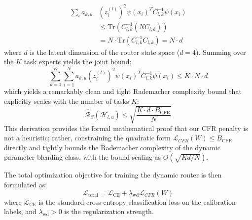 \begin{align}
    \sum_i a_{k, u}&(z_i^{(l)})^2 \psi(x_i)^T C_{l, k}^{-1} \psi(x_i) \nonumber \\
    &\leq \text{Tr}( C_{l, k}^{-1} ( N C_{l, k} ) ) \nonumber \\
    &= N \cdot \text{Tr}\left( C_{l, k}^{-1} C_{l, k} \right) = N \cdot d
\end{align}
where $d$ is the latent dimension of the router state space ($d=4$). Summing over the $K$ task experts yields the joint bound:
\begin{equation}
    \sum_{k=1}^K \sum_{i=1}^N a_{k, u}(z_i^{(l)})^2 \psi(x_i)^T C_{l, k}^{-1} \psi(x_i) \leq K \cdot N \cdot d
\end{equation}
which yields a remarkably clean and tight Rademacher complexity bound that explicitly scales with the number of tasks $K$:
\begin{equation}
    \hat{\mathcal{R}}_S(\mathcal{H}_{l, u}) \leq \sqrt{ \frac{K \cdot d \cdot B_{\text{CFR}}}{N} }
\end{equation}
This derivation provides the formal mathematical proof that our CFR penalty is not a heuristic; rather, constraining the quadratic form $\mathcal{L}_{CFR}(W) \leq B_{\text{CFR}}$ directly and tightly bounds the Rademacher complexity of the dynamic parameter blending class, with the bound scaling as $O(\sqrt{K d / N})$.

The total optimization objective for training the dynamic router is then formulated as:
\begin{equation}
    \mathcal{L}_{\text{total}} = \mathcal{L}_{\text{CE}} + \lambda_{\text{wd}} \mathcal{L}_{CFR}(W)
\end{equation}
where $\mathcal{L}_{\text{CE}}$ is the standard cross-entropy classification loss on the calibration labels, and $\lambda_{\text{wd}} > 0$ is the regularization strength. 

